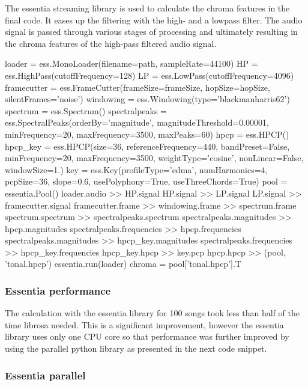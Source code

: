 The essentia streaming library is used to calculate the chroma features in the final code. It eases up the filtering with the high- and a lowpass filter. The audio signal is passed through various stages of processing and ultimately resulting in the chroma features of the high-pass filtered audio signal. 
\begin{pythonCode}
loader = ess.MonoLoader(filename=path, sampleRate=44100)
HP = ess.HighPass(cutoffFrequency=128)
LP = ess.LowPass(cutoffFrequency=4096)
framecutter = ess.FrameCutter(frameSize=frameSize, hopSize=hopSize, silentFrames='noise')
windowing = ess.Windowing(type='blackmanharris62')
spectrum = ess.Spectrum()
spectralpeaks = ess.SpectralPeaks(orderBy='magnitude', magnitudeThreshold=0.00001, 
	minFrequency=20, maxFrequency=3500, maxPeaks=60)
hpcp = ess.HPCP()
hpcp_key = ess.HPCP(size=36, referenceFrequency=440, bandPreset=False, minFrequency=20,
	maxFrequency=3500, weightType='cosine', nonLinear=False, windowSize=1.)
key = ess.Key(profileType='edma', numHarmonics=4, pcpSize=36, slope=0.6, 
	usePolyphony=True, useThreeChords=True)
pool = essentia.Pool()
loader.audio >> HP.signal
HP.signal >> LP.signal
LP.signal >> framecutter.signal    
framecutter.frame >> windowing.frame >> spectrum.frame
spectrum.spectrum >> spectralpeaks.spectrum
spectralpeaks.magnitudes >> hpcp.magnitudes
spectralpeaks.frequencies >> hpcp.frequencies
spectralpeaks.magnitudes >> hpcp_key.magnitudes
spectralpeaks.frequencies >> hpcp_key.frequencies
hpcp_key.hpcp >> key.pcp
hpcp.hpcp >> (pool, 'tonal.hpcp')
essentia.run(loader)
chroma = pool['tonal.hpcp'].T
\end{pythonCode}	

\subsubsection{Essentia performance}

The calculation with the essentia library for 100 songs took less than half of the time librosa needed. This is a significant improvement, however the essentia library uses only one CPU core so that performance was further improved by using the parallel python library as presented in the next code snippet.

\subsubsection{Essentia parallel}

